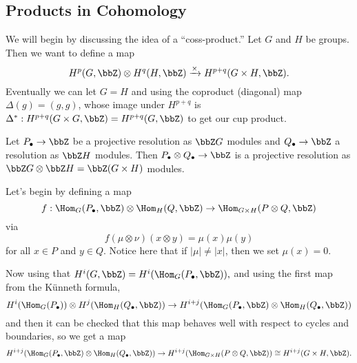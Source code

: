 \documentclass[12pt]{article}
\begin{document}
\subsection{Products in Cohomology}
We will begin by discussing the idea of a ``coss-product.'' Let $G$ and $H$ be groups. Then we want to define 
a map 
\[H^p(G,\bbZ)\otimes H^q(H,\bbZ)\xrightarrow{\times} H^{p+q}(G\times H,\bbZ).\]
Eventually we can let $G=H$ and using the coproduct (diagonal) map $\Delta(g)=(g,g)$, whose image under $H^{p+q}$ is 
$\Delta^\ast:H^{p+q}(G\times G,\bbZ)=H^{p+q}(G,\bbZ)$ to get our cup product.

\begin{prop}
	Let $P_\bullet\to\bbZ$ be a projective resolution as $\bbZ G$ modules and $Q_\bullet\to\bbZ$ a resolution as $\bbZ H$ modules.
	Then $P_\bullet\otimes Q_\bullet\to\bbZ$ is a projective resolution as $\bbZ G\otimes \bbZ H=\bbZ(G\times H)$ modules.
\end{prop}

Let's begin by defining a map
\[f:\Hom_G(P_\bullet,\bbZ)\otimes \Hom_H(Q,\bbZ)\to \Hom_{G\times H}(P\otimes Q,\bbZ)\]
via
\[f(\mu\otimes \nu)(x\otimes y)=\mu(x)\mu(y)\]
for all $x\in P$ and $y\in Q$. Notice here that if $|\mu|\ne |x|$, then we set $\mu(x)=0$.

Now using that $H^i(G,\bbZ)=H^i(\Hom_G(P_\bullet,\bbZ)),$ and using the first map from the K\"unneth formula,
\[H^i(\Hom_G(P_\bullet))\otimes H^j(\Hom_H(Q_\bullet,\bbZ))\to H^{i+j}(\Hom_G(P_\bullet,\bbZ)\otimes \Hom_H(Q_\bullet,\bbZ))\]
and then it can be checked that this map behaves well with respect to cycles and boundaries, so we 
get a map 
\[H^{i+j}(\Hom_G(P_\bullet,\bbZ)\otimes \Hom_H(Q_\bullet,\bbZ))\to H^{i+j}(\Hom_{G\times H}(P\otimes Q,\bbZ))\cong H^{i+j}(G\times H,\bbZ).\]


\newpage
\end{document}

